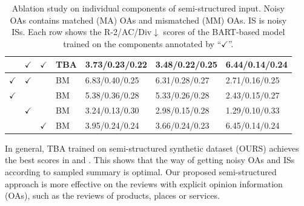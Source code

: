 {\begin{table}[th]
\begin{tabular}{|p{0.15cm}p{0.15cm}p{0.15cm}p{0.5cm}m{1.2cm}<{\centering}m{1.2cm}<{\centering}m{1.3cm}<{\centering}|}
		& $\checkmark$ & $\checkmark$&TBA & 3.73/0.23/0.22 & 3.48/0.22/0.25& 6.44/0.14/0.24  \\
		\hline
		$\checkmark$ & $\checkmark$ & & BM& 6.83/0.40/0.25& 6.31/0.28/0.27 & 2.71/0.16/0.25  \\
		$\checkmark$ &  & & BM & 5.38/0.36/0.28& 5.33/0.26/0.28 & 2.43/0.15/0.27 \\
		& $\checkmark$ & & BM & 3.24/0.13/0.30 & 2.98/0.15/0.28& 1.29/0.10/0.33 \\
		\hline
		& & $\checkmark$ & BM & 3.95/0.24/0.24 & 3.66/0.24/0.23& 6.45/0.14/0.24  \\
		\hline
	\end{tabular}
	\caption{Ablation study on individual components of semi-structured input. 
		Noisy OAs contains matched (MA) OAs and mismatched (MM) OAs. IS is noisy ISs. 
		Each row shows the R-2/AC/Div$\downarrow$ scores of the  BART-based model trained on the components annotated by ``$\checkmark$''.}
	\label{tab:abl_comp}
\end{table}

In general, TBA trained on semi-structured synthetic dataset (OURS) achieves the best scores in  and . This shows that the way of getting noisy OAs and ISs according to sampled summary is optimal.
Our proposed semi-structured approach is more effective on the reviews with explicit opinion information (OAs), such as the reviews of products, places or services.
}%





